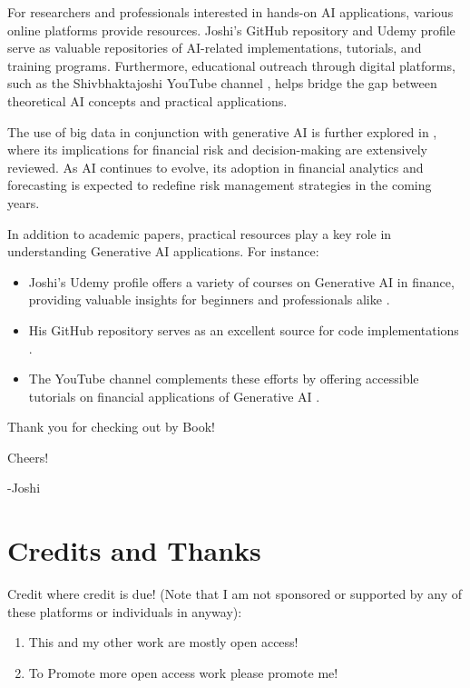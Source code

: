 \documentclass[a4paper,headinclude=on,footinclude=on,12pt,oneside]{scrbook}
\begin{document}
For researchers and professionals interested in hands-on AI applications, various online platforms provide resources. Joshi's GitHub repository \cite{JoshiGit2025} and Udemy profile \cite{JoshiUdemy2025} serve as valuable repositories of AI-related implementations, tutorials, and training programs. Furthermore, educational outreach through digital platforms, such as the Shivbhaktajoshi YouTube channel \cite{JoshiYouTube2025}, helps bridge the gap between theoretical AI concepts and practical applications.

The use of big data in conjunction with generative AI is further explored in \cite{JoshiWiley2025}, where its implications for financial risk and decision-making are extensively reviewed. As AI continues to evolve, its adoption in financial analytics and forecasting is expected to redefine risk management strategies in the coming years.




In addition to academic papers, practical resources play a key role in understanding Generative AI applications. For instance:
\begin{itemize}
	\item Joshi’s Udemy profile offers a variety of courses on Generative AI in finance, providing valuable insights for beginners and professionals alike \cite{JoshiUdemy2025}.
	\item His GitHub repository serves as an excellent source for code implementations \cite{JoshiGit2025}.
	\item The YouTube channel complements these efforts by offering accessible tutorials on financial applications of Generative AI \cite{JoshiYouTube2025}.
\end{itemize}



Thank you for checking out by Book!

Cheers! \beers

-Joshi

\chapter*{Credits and Thanks}

Credit where credit is due! (Note that I am not sponsored or supported by any of these platforms or individuals in anyway):

\begin{enumerate}
	\item This and my other work are mostly open access!
	\item To Promote more open access work please promote me!
	
\end{enumerate}
\end{document}
